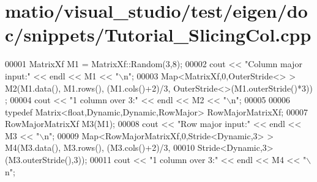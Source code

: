 \hypertarget{matio_2visual__studio_2test_2eigen_2doc_2snippets_2_tutorial___slicing_col_8cpp_source}{}\section{matio/visual\+\_\+studio/test/eigen/doc/snippets/\+Tutorial\+\_\+\+Slicing\+Col.cpp}
\label{matio_2visual__studio_2test_2eigen_2doc_2snippets_2_tutorial___slicing_col_8cpp_source}

\begin{DoxyCode}
00001 MatrixXf M1 = MatrixXf::Random(3,8);
00002 cout << \textcolor{stringliteral}{"Column major input:"} << endl << M1 << \textcolor{stringliteral}{"\(\backslash\)n"};
00003 Map<MatrixXf,0,OuterStride<> > M2(M1.data(), M1.rows(), (M1.cols()+2)/3, OuterStride<>(M1.outerStride()*3))
      ;
00004 cout << \textcolor{stringliteral}{"1 column over 3:"} << endl << M2 << \textcolor{stringliteral}{"\(\backslash\)n"};
00005 
00006 \textcolor{keyword}{typedef} Matrix<float,Dynamic,Dynamic,RowMajor> RowMajorMatrixXf;
00007 RowMajorMatrixXf M3(M1);
00008 cout << \textcolor{stringliteral}{"Row major input:"} << endl << M3 << \textcolor{stringliteral}{"\(\backslash\)n"};
00009 Map<RowMajorMatrixXf,0,Stride<Dynamic,3> > M4(M3.data(), M3.rows(), (M3.cols()+2)/3,
00010                                               Stride<Dynamic,3>(M3.outerStride(),3));
00011 cout << \textcolor{stringliteral}{"1 column over 3:"} << endl << M4 << \textcolor{stringliteral}{"\(\backslash\)n"};
\end{DoxyCode}
